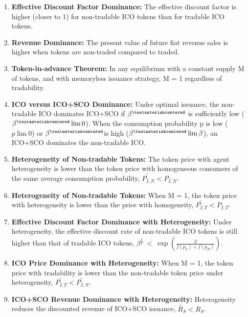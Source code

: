         \begin{enumerate}

        \item \textbf{Effective Discount Factor Dominance:} The effective discount factor is higher (closer to 1) for non-tradable ICO tokens than for tradable ICO tokens.

        \item \textbf{Revenue Dominance:} The present value of future fiat revenue sales is higher when tokens are non-traded compared to traded.

        \item \textbf{Token-in-advance Theorem:} In any equilibrium with a constant supply M of tokens, and with memoryless issuance strategy, M = 1 regardless of tradability.

        \item \textbf{ICO versus ICO+SCO Dominance:} Under optimal issuance, the non-tradable ICO dominates ICO+SCO if $\beta^{\textasteriskcentered}$ is sufficiently low ($\beta^{\textasteriskcentered} \lim 0$). When the consumption probability p is low ($p \lim 0$) or $\beta^{\textasteriskcentered}$is high ($\beta^{\textasteriskcentered} \lim \beta$), an ICO+SCO dominates the non-tradable ICO.

        \item \textbf{Heterogeneity of Non-tradable Tokens:} The token price with agent heterogeneity is lower than the token price with homogeneous consumers of the same average consumption probability, $\widetilde{P_{I,N}}<P_{I,N}$.

        \item \textbf{Heterogeneity of Non-tradable Tokens:} When M = 1, the token price with heterogeneity is lower than the price with homogeneity, $\widetilde{P_{I,T}}<P_{I,T}$.

        \item \textbf{Effective Discount Factor Dominance with Heterogeneity:} Under heterogeneity, the effective discount rate of non-tradable ICO tokens is still higher than that of tradable ICO tokens, $\beta^{\frac{1}{p}}\ <\ \exp{(\frac{2}{f(p_{L})+f(p_{H})})}$.

        \item \textbf{ICO Price Dominance with Heterogeneity:} When M = 1, the token price with tradability is lower than the non-tradable token price under heterogeneity, $\widetilde{P_{I,T}}<\widetilde{P_{I,N}}$.

        \item \textbf{ICO+SCO Revenue Dominance with Heterogeneity:} Heterogeneity reduces the discounted revenue of ICO+SCO issuance, $\widetilde{R_{S}}<R_{S}$.

        \end{enumerate}